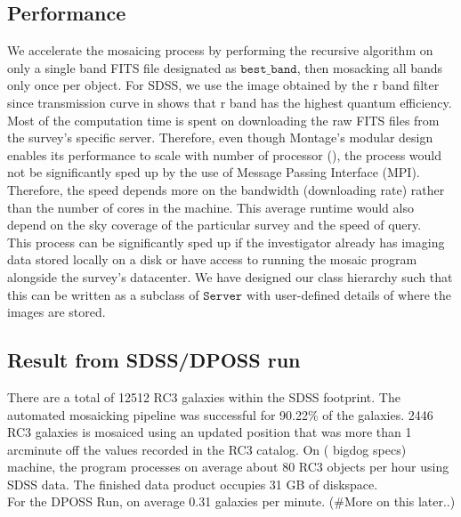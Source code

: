 \documentclass[5p]{elsarticle}
\begin{document}
	\subsection{Performance}	
	\indent We accelerate the mosaicing process by performing the recursive algorithm on only a single band FITS file designated as $\texttt{best\_band}$, then mosacking all bands only once per object. For SDSS, we use the image obtained by the r band filter since transmission curve in \citet{edr} shows that r band has the highest quantum efficiency. 
	\\ \indent  Most of the computation time is spent on downloading the raw FITS files from the survey's specific server. Therefore, even though Montage's modular design enables its performance to scale with number of processor  (\citet{montage}), the process would not be significantly sped up by the use of Message Passing Interface (MPI). Therefore, the speed depends more on the bandwidth (downloading rate) rather than the number of cores in the machine. This average runtime would also depend on the sky coverage of the  particular survey and the speed of query.
	\\ \indent This process can  be significantly sped up if the investigator already has imaging data stored locally on a disk or have access to running the mosaic program alongside the survey's datacenter. We have designed our class hierarchy such that this can be written as a subclass of $\texttt{Server}$ with user-defined details of where the images are stored.


\subsection{Result from SDSS/DPOSS run}
\indent There are a total of 12512 RC3 galaxies within the SDSS footprint. The automated mosaicking pipeline was  successful for 90.22\% of the galaxies. 2446 RC3 galaxies is mosaiced using an updated position that was more than 1 arcminute off the values recorded in the RC3 catalog.  On ( bigdog specs)  machine, the program processes on average about 80 RC3 objects per hour using SDSS data.  %
The finished data product occupies 31 GB of diskspace. 
\\
\indent  For the DPOSS Run, on average 0.31 galaxies per minute. (\#More on this later..)
\end{document}
